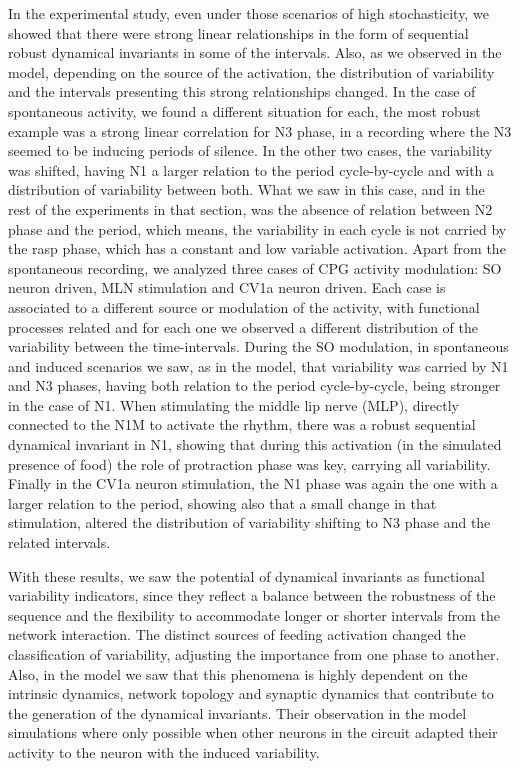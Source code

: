 In the experimental study, even under those scenarios of high stochasticity, we showed that there were strong linear relationships in the form of sequential robust dynamical invariants in some of the intervals. Also, as we observed in the model, depending on the source of the activation, the distribution of variability and the intervals presenting this strong relationships changed. In the case of spontaneous activity, we found a different situation for each, the most robust example was a strong linear correlation for N3 phase, in a recording where the N3 seemed to be inducing periods of silence. In the other two cases, the variability was shifted, having N1 a larger relation to the period cycle-by-cycle and with a distribution of variability between both. What we saw in this case, and in the rest of the experiments in that section, was the absence of relation between N2 phase and the period, which means, the variability in each cycle is not carried by the rasp phase, which has a constant and low variable activation. Apart from the spontaneous recording, we analyzed three cases of CPG activity modulation: SO neuron driven, MLN stimulation and CV1a neuron driven. Each case is associated to a different source or modulation of the activity, with functional processes related and for each one we observed a different distribution of the variability between the time-intervals. During the SO modulation, in spontaneous and induced scenarios we saw, as in the model, that variability was carried by N1 and N3 phases, having both relation to the period cycle-by-cycle, being stronger in the case of N1. When stimulating the middle lip nerve (MLP), directly connected to the N1M to activate the rhythm, there was a robust sequential dynamical invariant in N1, showing that during this activation (in the simulated presence of food) the role of protraction phase was key, carrying all variability. Finally in the CV1a neuron stimulation, the N1 phase was again the one with a larger relation to the period, showing also that a small change in that stimulation, altered the distribution of variability shifting to N3 phase and the related intervals. 

With these results, we saw the potential of dynamical invariants as functional variability indicators, since they reflect a balance between the robustness of the sequence and the flexibility to accommodate longer or shorter intervals from the network interaction. The distinct sources of feeding activation changed the classification of variability, adjusting the importance from one phase to another. Also, in the model we saw that this phenomena is highly dependent on the intrinsic dynamics, network topology and synaptic dynamics that contribute to the generation of the dynamical invariants. Their observation in the model simulations where only possible when other neurons in the circuit adapted their activity to the neuron with the induced variability. 


